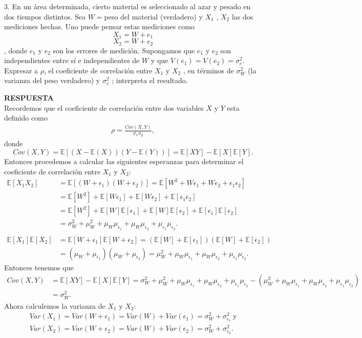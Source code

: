 \documentclass[11pt,letterpaper]{article}
\newcommand{\mE}{\mathbb{E}}
\newcommand{\res}{\textbf{RESPUESTA}\\}
\begin{document}
3. En un área determinada, cierto material es seleccionado al azar y pesado en dos tiempos distintos. Sea $W = $peso del material (verdadero) y $X_1$ , $X_2$ las dos mediciones hechas. Uno puede pensar estas mediciones como
$$X_1 =W + e_1$$
$$X_2 =W + e_2$$,
donde $e_1$ y $e_2$ son los errores de medición. Supongamos que $e_1$ y $e_2$ son independientes entre sí e independientes de $W$ y que $V(e_1)=V(e_2)=\sigma_e^2$. Expresar a $\rho$, el coeficiente de correlación entre $X_1$ y $X_2$ , en términos de $\sigma_W^2$ (la varianza del peso verdadero) y $\sigma_e^2$ ; interpreta el resultado.

\res Recordemos que el coeficiente de correlación entre dos variables $X$ y $Y$ esta definido como
\begin{align*}
\rho=\frac{Cov(X,Y)}{\sigma_x\sigma_y},
\end{align*}
donde $$Cov(X,Y)=\mE[(X-\mE(X))(Y-\mE(Y))]=\mE[XY]-\mE[X]\mE[Y].$$
Entonces procedemos a calcular las siguientes esperanzas para determinar el coeficiente de correlación entre $X_1$ y $X_2$:
\begin{align*}
\mE[X_1X_2]&=\mE[(W+\epsilon_1)(W+\epsilon_2)]=\mE[W^2+W\epsilon_1+W\epsilon_2+\epsilon_1\epsilon_2]\\
&=\mE[W^2]+\mE[W\epsilon_1]+\mE[W\epsilon_2]+\mE[\epsilon_1\epsilon_2]\\
&=\mE[W^2]+\mE[W]\mE[\epsilon_1]+\mE[W]\mE[\epsilon_2]+\mE[\epsilon_1]\mE[\epsilon_2]\\
&=\sigma_W^2+\mu_W^2+\mu_W\mu_{\epsilon_1}+\mu_W\mu_{\epsilon_2}+\mu_{\epsilon_1}\mu_{\epsilon_2}.\\ \\
\mE[X_1]\mE[X_2]&=\mE[W+\epsilon_1]\mE[W+\epsilon_2]=(\mE[W]+\mE[\epsilon_1])(\mE[W]+\mE[\epsilon_2])\\
&=(\mu_W+\mu_{\epsilon_1})(\mu_W+\mu_{\epsilon_2}) = \mu_W^2+\mu_W\mu_{\epsilon_1}+\mu_W\mu_{\epsilon_2}+\mu_{\epsilon_1}\mu_{\epsilon_2}.
\end{align*}
Entonces tenemos que 
\begin{align*}
Cov(X,Y)&=\mE[XY]-\mE[X]\mE[Y]=\sigma_W^2+\mu_W^2+\mu_W\mu_{\epsilon_1}+\mu_W\mu_{\epsilon_2}+\mu_{\epsilon_1}\mu_{\epsilon_2}-(\mu_W^2+\mu_W\mu_{\epsilon_1}+\mu_W\mu_{\epsilon_2}+\mu_{\epsilon_1}\mu_{\epsilon_2})\\
&=\sigma_W^2.
\end{align*}
Ahora calculemos la varianza de $X_1$ y $X_2$:
\begin{align*}
Var(X_1)=Var(W+\epsilon_1)=Var(W)+Var(\epsilon_1)=\sigma_W^2+\sigma_{\epsilon_1}^2\ \text{y} \\
Var(X_2)=Var(W+\epsilon_2)=Var(W)+Var(\epsilon_2)=\sigma_W^2+\sigma_{\epsilon_2}^2.
\end{align*}
\end{document}
